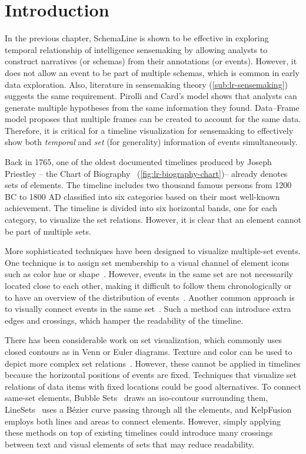 \section{Introduction}
In the previous chapter, SchemaLine is shown to be effective in exploring temporal relationship of intelligence sensemaking by allowing analysts to construct narratives (or schemas) from their annotations (or events). However, it does not allow an event to be part of multiple schemas, which is common in early data exploration. Also, literature in sensemaking theory (\autoref{sub:lr-sensemaking})  suggests the same requirement. Pirolli and Card's model shows that analysts can generate multiple hypotheses from the same information they found. Data--Frame model proposes that multiple frames can be created to account for the same data. Therefore, it is critical for a timeline visualization for sensemaking to effectively show both \emph{temporal} and \emph{set} (for generality) information of events simultaneously.

Back in 1765, one of the oldest documented timelines produced by Joseph Priestley -- the Chart of Biography~\cite{Priestley1765} (\autoref{fig:lr-biography-chart})-- already denotes sets of elements. The timeline includes two thousand famous persons from 1200 BC to 1800 AD classified into six categories based on their most well-known achievement. The timeline is divided into six horizontal bands, one for each category, to visualize the set relations. However, it is clear that an element cannot be part of multiple sets. 

More sophisticated techniques have been designed to visualize multiple-set events. One technique is to assign set membership to a visual channel of element icons such as color hue or shape~\cite{TimeGlider2016}. However, events in the same set are not necessarily located close to each other, making it difficult to follow them chronologically or to have an overview of the distribution of events~\cite{SimileTimeline2009,TimeGlider2016}. Another common approach is to visually connect events in the same set~\cite{Kumar1998}. Such a method can introduce extra edges and crossings, which hamper the readability of the timeline. 

There has been considerable work on set visualization, which commonly uses closed contours as in Venn or Euler diagrams. Texture and color can be used to depict more complex set relations~\cite{Ware2013}. However, these cannot be applied in timelines because the horizontal positions of events are fixed. Techniques that visualize set relations of data items with fixed locations could be good alternatives. To connect same-set elements, Bubble Sets~\cite{Collins2009a} draws an iso-contour surrounding them, LineSets~\cite{Alper2011} uses a B\'{e}zier curve passing through all the elements, and KelpFusion~\cite{Meulemans2013} employs both lines and areas to connect elements. However, simply applying these methods on top of existing timelines could introduce many crossings between text and visual elements of sets that may reduce readability.

